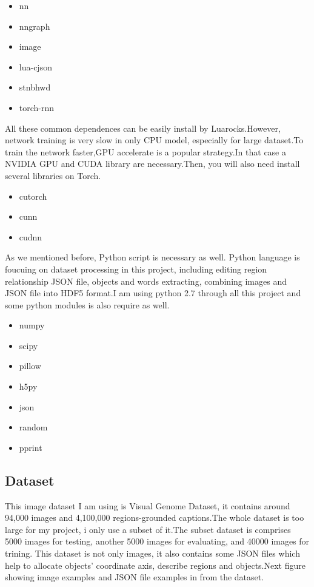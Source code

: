 \documentclass[12pt,a4paper]{report}
\begin{document}
\begin{itemize}
\item nn
\item nngraph
\item image
\item lua-cjson
\item stnbhwd
\item torch-rnn
\end{itemize}
All these common dependences can be easily install by Luarocks.However, network training is very slow in only CPU model, especially for large dataset.To train the network faster,GPU accelerate is a popular strategy.In that case a NVIDIA GPU and CUDA library  are necessary.Then, you will also need  install several libraries on Torch.
\begin{itemize}
\item cutorch
\item cunn
\item cudnn
\end{itemize}
As we mentioned before, Python script  is necessary as well. Python language is foucuing on dataset processing in this project, including editing region relationship JSON file, objects and words extracting, combining images and JSON file into HDF5 format.I am using python 2.7 through all this project and some python modules is also require as well.
\begin{itemize}
\item numpy
\item scipy
\item pillow
\item h5py
\item json
\item random
\item pprint
\end{itemize}
\subsection{Dataset}
This image dataset I am using is Visual Genome Dataset, it contains around 94,000 images and 4,100,000 regions-grounded captions.The whole dataset is too large for my project, i only use a subset of it.The subset dataset is comprises 5000 images for testing, another 5000 images for evaluating, and 40000 images for trining.
This dataset is not only images, it also contains some JSON files which help to allocate objects' coordinate axis, describe regions and objects.Next figure showing image examples and JSON file examples in from the dataset.
\end{document}
